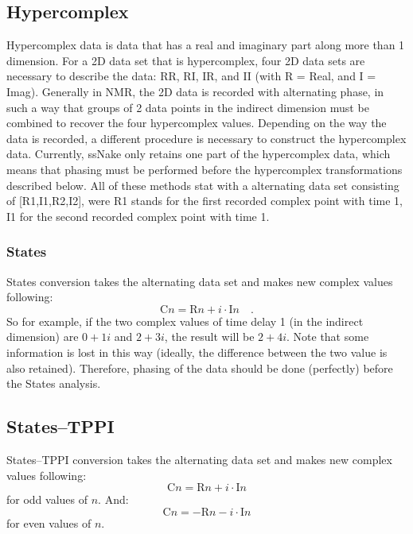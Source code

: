 \documentclass[11pt,a4paper]{article}
\begin{document}
\subsection{Hypercomplex}
Hypercomplex data is data that has a real and imaginary part along more than 1 dimension. For a 2D data set that is hypercomplex, four 2D data sets are necessary to
describe the data: RR, RI, IR, and II (with R = Real, and I = Imag).
Generally in NMR, the 2D data is recorded with alternating phase, in such a way that groups of 2 data points in the indirect dimension must be combined to recover
the four hypercomplex values. Depending on the way the data is recorded, a different procedure is necessary to construct the hypercomplex data.
Currently, ssNake only retains one part of the hypercomplex data, which means that phasing must be performed before the hypercomplex transformations described below. 
All of these methods stat with a alternating data set consisting of [R1,I1,R2,I2], were R1 stands for the first recorded complex point with time 1, I1 for the second
recorded complex point with time 1.

\subsubsection{States}
States conversion takes the alternating data set and makes new complex values following:
\begin{equation*}
  \text{C}n = \text{R}n + i \cdot \text{I}n \quad .
\end{equation*}
So for example, if the two complex values of time delay 1 (in the indirect dimension) are $0+1i$ and $2+3i$, the result will be $2+4i$. Note that some 
information is lost in this way (ideally, the difference between the two value is also retained). Therefore, phasing of the data should be done (perfectly) before the States analysis.

\subsection{States--TPPI}

States--TPPI conversion takes the alternating data set and makes new complex values following:
\begin{equation*}
  \text{C}n = \text{R}n + i \cdot \text{I}n 
\end{equation*}
for odd values of $n$. And:
\begin{equation*}
  \text{C}n = -\text{R}n - i \cdot \text{I}n 
\end{equation*}
for even values of $n$.
\end{document}
